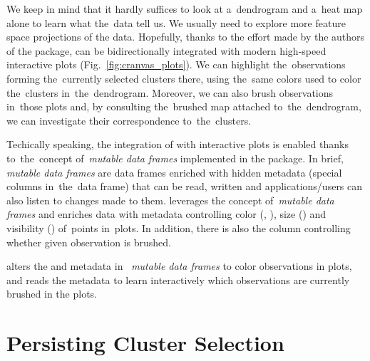 \documentclass[article]{jss}
\newcommand{\myemph}[1]{\emph{#1}}
\newcommand{\Rfunction}[1]{\code{#1}}
\begin{document}
We keep in mind that %
it hardly suffices to look at a~dendrogram and a~heat map alone to
learn what the~data tell us. We usually need to explore more feature space
projections of the data. 
Hopefully, thanks to the effort made by the authors of the 
package,
 can be bidirectionally integrated 
with modern high-speed interactive  plots
(Fig.~\ref{fig:cranvas_plots}). 
We can highlight the~observations forming the~currently selected
clusters there, using the~same colors used to color the~clusters
in~the~dendrogram. 
Moreover, we can also brush observations in~those plots
and, by consulting the~brushed map attached to~the~dendrogram,
we can investigate their correspondence to~the~clusters.

Techically speaking, the integration of \Rfunction{idendro}
with  interactive plots is enabled thanks to~the~concept
of~\myemph{mutable data frames} implemented in the 
package. In brief, \myemph{mutable data frames} are data frames
enriched with hidden metadata (special columns in~the~data frame) that
can be read, written and applications/users can also listen to changes
made to them. 
 leverages the concept of~\myemph{mutable data frames} and
enriches data with metadata controlling color (,
), size () and visibility ()
of~points in~plots. In addition, there is also the 
column controlling whether given observation is brushed.

\Rfunction{idendro} alters the  and  
metadata in~ \myemph{mutable data frames} to color
observations in  plots, and reads the 
 metadata to learn interactively which observations
are currently brushed in the plots. 

\section{Persisting Cluster Selection}
\end{document}
